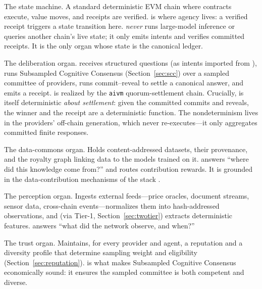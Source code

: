 \begin{description}[style=nextline,leftmargin=0pt]
\item[\CChain{} --- Cortex (deterministic execution).] The state machine. A standard deterministic EVM chain where contracts execute, value moves, and receipts are verified. \CChain{} is where agency lives: a verified \PoT{} receipt triggers a state transition here. \CChain{} \emph{never} runs large-model inference or queries another chain's live state; it only emits intents and verifies committed receipts. It is the only organ whose state is the canonical ledger.

\item[\AChain{} --- Cognition (deliberation \& settlement).] The deliberation organ. \AChain{} receives structured questions (as intents imported from \CChain{}), runs Subsampled Cognitive Consensus (Section~\ref{sec:scc}) over a sampled committee of providers, runs commit--reveal to settle a canonical answer, and emits a \PoT{} receipt. \AChain{} is realized by the \texttt{aivm} quorum-settlement chain. Crucially, \AChain{} is itself deterministic \emph{about settlement}: given the committed commits and reveals, the winner and the receipt are a deterministic function. The nondeterminism lives in the providers' off-chain generation, which \AChain{} never re-executes---it only aggregates committed finite responses.

\item[\DChain{} --- Data \& provenance.] The data-commons organ. Holds content-addressed datasets, their provenance, and the royalty graph linking data to the models trained on it. \DChain{} answers ``where did this knowledge come from?'' and routes contribution rewards. It is grounded in the data-contribution mechanisms of the \Zoo{} stack \cite{zoo-experience-ledger}.

\item[\SChain{} --- Sensory (perception).] The perception organ. Ingests external feeds---price oracles, document streams, sensor data, cross-chain events---normalizes them into hash-addressed observations, and (via Tier-1, Section~\ref{sec:twotier}) extracts deterministic features. \SChain{} answers ``what did the network observe, and when?''

\item[\RChain{} --- Reputation (eligibility \& trust).] The trust organ. Maintains, for every provider and agent, a reputation and a diversity profile that determine sampling weight and eligibility (Section~\ref{sec:reputation}). \RChain{} is what makes Subsampled Cognitive Consensus economically sound: it ensures the sampled committee is both competent and diverse.


\end{description}
